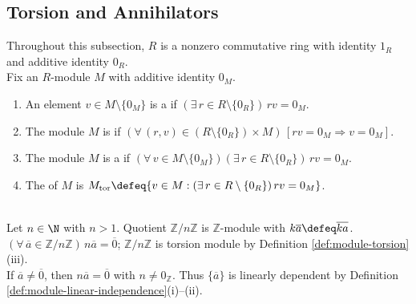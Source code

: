\subsection{Torsion and Annihilators}

Throughout this subsection, $R$ is a nonzero commutative ring with identity $1_R$ and additive identity $0_R$.\\
Fix an $R$-module $M$ with additive identity $0_M$.

\begin{definition} \label{def:module-torsion} 
\begin{enumerate}[label=(\roman*)]
\setlength{\itemsep}{0pt}
\item An element $v\in M\setminus\{0_M\}$ is a  if $(\exists\,r\in R\setminus\{0_R\})\,rv=0_M$.
\item The module $M$ is  if $(\forall\,(r,v)\in(R\setminus\{0_R\})\times M)\,[rv=0_M\Rightarrow v=0_M]$.
\item The module $M$ is a  if $(\forall\,v\in M\setminus\{0_M\})(\exists\,r\in R\setminus\{0_R\})\,rv=0_M$.
\item The  of $M$ is $M_{\operatorname{tor}}\defeq\{v\in M:(\exists\,r\in R\setminus\{0_R\})\,rv=0_M\}$.
\end{enumerate}
\end{definition}

\begin{example} \label{ex:zn-is-torsion-module} \\
Let $n\in\N$ with $n>1$. Quotient $\mathbb{Z}/n\mathbb{Z}$ is $\mathbb{Z}$-module with $k\overline{a}\defeq\overline{ka}$. $(\forall\,\overline{a}\in\mathbb{Z}/n\mathbb{Z})\,n\overline{a}=\overline{0}$; $\mathbb{Z}/n\mathbb{Z}$ is torsion module by Definition \ref{def:module-torsion}(iii).\\
If $\overline{a}\neq\overline{0}$, then $n\overline{a}=\overline{0}$ with $n\neq0_{\mathbb{Z}}$. Thus $\{\overline{a}\}$ is linearly dependent by Definition \ref{def:module-linear-independence}(i)--(ii).
\end{example}

